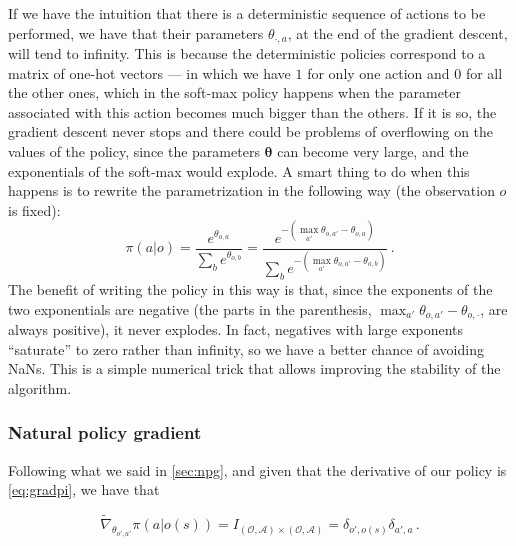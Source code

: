If we have the intuition that there is a deterministic sequence of actions to be performed, we have that their parameters $\theta_{\cdot,a}$, at the end of the gradient descent, will tend to infinity. This is because the deterministic policies correspond to a matrix of one-hot vectors --- in which we have $1$ for only one action and $0$ for all the other ones, which in the soft-max policy happens when the parameter associated with this action becomes much bigger than the others. If it is so, the gradient descent never stops and there could be problems of overflowing on the values of the policy, since the parameters $\boldsymbol \theta$ can become very large, and the exponentials of the soft-max would explode. A smart thing to do when this happens is to rewrite the parametrization in the following way (the observation $o$ is fixed):
\begin{equation}
    \pi(a | o) = \frac{e^{\theta_{o,a}}}{\sum_b e^{\theta_{o,b}}} = \frac{e^{-(\max_{a'} \theta_{o,a'} - \theta_{o,a})}}{\sum_b e^{-(\max_{a'} \theta_{o,a'} - \theta_{o,b})}} \, .
    \label{eq:pi-clipped}
\end{equation}
The benefit of writing the policy in this way is that, since the exponents of the two exponentials are negative (the parts in the parenthesis, $\max_{a'} \theta_{o,a'} - \theta_{o,\cdot}$, are always positive), it never explodes. In fact, negatives with large exponents ``saturate'' to zero rather than infinity, so we have a better chance of avoiding NaNs. This is a simple numerical trick that allows improving the stability of the algorithm. %


\subsubsection{Natural policy gradient}

Following what we said in \autoref{sec:npg}, and given that the derivative of our policy is \eqref{eq:gradpi}, we have that

\begin{equation}
    \widetilde \nabla_{\theta_{o',a'}} \pi(a|o(s)) = I_{(\mathcal O, \mathcal A) \times (\mathcal O, \mathcal A)} = \delta_{o', o(s)} \delta_{a',a} \, .
\end{equation}

